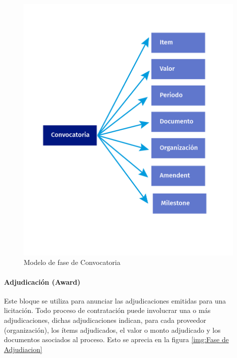 \begin{figure}[htbp!]
    \centering
    \includegraphics[width=150mm]{figuras/Diagramas_Convocatoria.png}
    \caption{Modelo de fase de Convocatoria}
    \label{img:Fase de Convocatoria}
\end{figure}

\paragraph{Adjudicación (Award)}
Este bloque se utiliza para anunciar las adjudicaciones emitidas para una licitación. Todo proceso de contratación puede involucrar una o más adjudicaciones, dichas adjudicaciones indican, para cada proveedor (organización), los ítems adjudicados, el valor o monto adjudicado y los documentos asociados al proceso. Esto se aprecia en la figura \ref{img:Fase de Adjudiacion}


